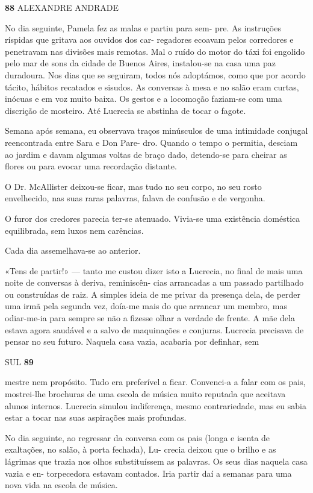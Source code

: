 \textbf{88 }ALEXANDRE ANDRADE

No dia seguinte, Pamela fez as malas e partiu para sem- pre. As
instruções ríspidas que gritava aos ouvidos dos car- regadores ecoavam
pelos corredores e penetravam nas divisões mais remotas. Mal o ruído do
motor do táxi foi engolido pelo mar de sons da cidade de Buenos Aires,
instalou-se na casa uma paz duradoura. Nos dias que se seguiram, todos
nós adoptámos, como que por acordo tácito, hábitos recatados e sisudos.
As conversas à mesa e no salão eram curtas, inócuas e em voz muito
baixa. Os gestos e a locomoção faziam-se com uma discrição de mosteiro.
Até Lucrecia se abstinha de tocar o fagote.

Semana após semana, eu observava traços minúsculos de uma intimidade
conjugal reencontrada entre Sara e Don Pare- dro. Quando o tempo o
permitia, desciam ao jardim e davam algumas voltas de braço dado,
detendo-se para cheirar as flores ou para evocar uma recordação
distante.

O Dr. McAllister deixou-se ficar, mas tudo no seu corpo, no seu rosto
envelhecido, nas suas raras palavras, falava de confusão e de vergonha.

O furor dos credores parecia ter-se atenuado. Vivia-se uma existência
doméstica equilibrada, sem luxos nem carências.

Cada dia assemelhava-se ao anterior.

«Tens de partir!» --- tanto me custou dizer isto a Lucrecia, no final de
mais uma noite de conversas à deriva, reminiscên- cias arrancadas a um
passado partilhado ou construídas de raiz. A simples ideia de me privar
da presença dela, de perder uma irmã pela segunda vez, doía-me mais do
que arrancar um membro, mas odiar-me-ia para sempre se não a fizesse
olhar a verdade de frente. A mãe dela estava agora saudável e a salvo de
maquinações e conjuras. Lucrecia precisava de pensar no seu futuro.
Naquela casa vazia, acabaria por definhar, sem

SUL \textbf{89}

mestre nem propósito. Tudo era preferível a ficar. Convenci-a a falar
com os pais, mostrei-lhe brochuras de uma escola de música muito
reputada que aceitava alunos internos. Lucrecia simulou indiferença,
mesmo contrariedade, mas eu sabia estar a tocar nas suas aspirações mais
profundas.

No dia seguinte, ao regressar da conversa com os pais (longa e isenta de
exaltações, no salão, à porta fechada), Lu- crecia deixou que o brilho e
as lágrimas que trazia nos olhos substituíssem as palavras. Os seus dias
naquela casa vazia e en- torpecedora estavam contados. Iria partir daí a
semanas para uma nova vida na escola de música.

